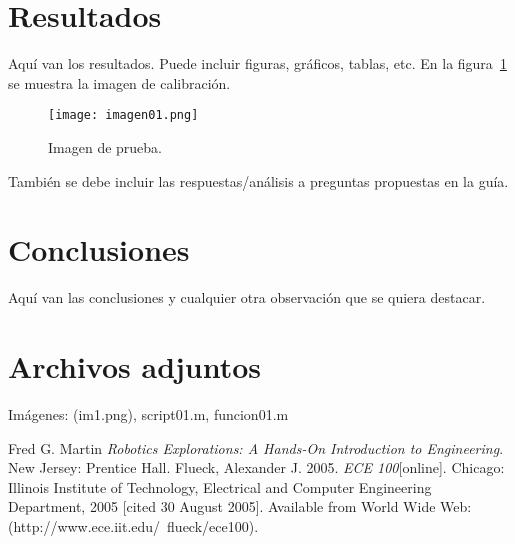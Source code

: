 \documentclass[a4paper, 11pt]{article}
\begin{document}
\section*{Resultados}
Aquí van los resultados. Puede incluir figuras, gráficos, tablas, etc. En la figura~\ref{fig:01} se muestra la imagen de calibración.


\begin{figure}
	\centering
		\texttt{[image: imagen01.png]}
	\caption{Imagen de prueba.}
	\label{fig:01}
\end{figure}

También se debe incluir las respuestas/análisis a preguntas propuestas en la guía.

\section*{Conclusiones}
Aquí van las conclusiones y cualquier otra observación que se quiera destacar.

\section*{Archivos adjuntos}
Imágenes: (im1.png), script01.m, funcion01.m

\begin{thebibliography}{9}
 Fred G. Martin \emph{Robotics Explorations: A Hands-On Introduction to Engineering}. New Jersey: Prentice Hall.
  Flueck, Alexander J. 2005. \emph{ECE 100}[online]. Chicago: Illinois Institute of Technology, Electrical and Computer Engineering Department, 2005 [cited 30
August 2005]. Available from World Wide Web: (http://www.ece.iit.edu/~flueck/ece100).
\end{thebibliography}
\end{document}

